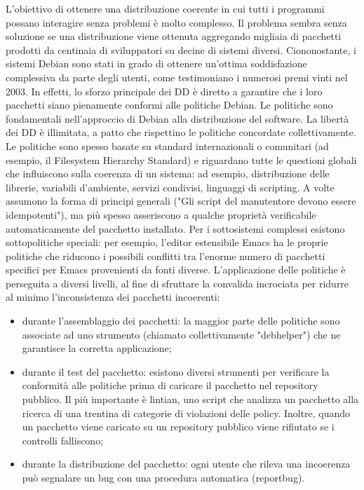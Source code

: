 \documentclass[a4paper,12pt,titlepage,oneside]{book}
\begin{document}
    L'obiettivo di ottenere una distribuzione coerente in cui tutti i programmi possano interagire senza problemi è molto complesso.
    Il problema sembra senza soluzione se una distribuzione viene ottenuta aggregando migliaia di pacchetti prodotti da centinaia di sviluppatori su decine di sistemi diversi. Ciononostante, 
    i sistemi Debian sono stati in grado di ottenere un'ottima soddisfazione complessiva da parte degli utenti, come testimoniano i numerosi premi vinti nel 2003. In effetti, lo sforzo principale dei
    DD è diretto a garantire che i loro pacchetti siano pienamente conformi alle politiche Debian. Le politiche sono fondamentali nell'approccio di Debian alla distribuzione del software.
    La libertà dei DD è illimitata, a patto che rispettino le politiche concordate collettivamente. Le politiche sono
    spesso basate su standard internazionali o comunitari (ad esempio, il Filesystem Hierarchy Standard) e riguardano tutte le questioni globali che influiscono sulla coerenza di un sistema: 
    ad esempio, distribuzione delle librerie, variabili d'ambiente, servizi condivisi, linguaggi di scripting. A volte assumono la forma di principi generali ("Gli script del manutentore
    devono essere idempotenti"), ma più spesso asseriscono a qualche proprietà verificabile automaticamente del pacchetto installato.
    Per i sottosistemi complessi esistono sottopolitiche speciali: per esempio, l'editor estensibile Emacs ha le proprie politiche che riducono i possibili conflitti tra l'enorme numero di pacchetti specifici
    per Emacs provenienti da fonti diverse. L'applicazione delle politiche è perseguita a diversi livelli, al fine di sfruttare la convalida incrociata per ridurre al minimo l'inconsistenza dei pacchetti incoerenti:
    \begin{itemize}
        \item durante l'assemblaggio dei pacchetti: la maggior parte delle politiche sono associate ad uno strumento (chiamato collettivamente "debhelper") che ne garantisce la corretta applicazione;
        \item durante il test del pacchetto: esistono diversi strumenti per verificare la conformità alle politiche prima di caricare il pacchetto nel repository pubblico. Il più importante è lintian, uno script che analizza un pacchetto alla ricerca di una trentina di
            categorie di violazioni delle policy. Inoltre, quando un pacchetto viene caricato su un repository pubblico viene rifiutato se i controlli falliscono;
        \item durante la distribuzione del pacchetto: ogni utente che rileva una incoerenza può segnalare un bug con una procedura automatica (reportbug).
    \end{itemize}
   
\end{document}

